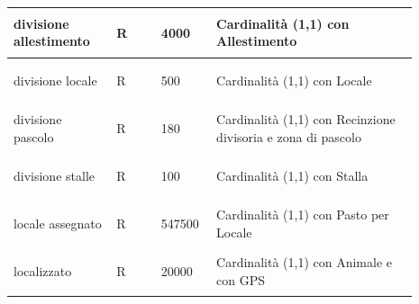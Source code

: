 \documentclass[12pt,a4paper]{article}
\begin{document}
\begin{center}
\begin{longtable}{|p{0.23\linewidth}|p{0.1\linewidth}|p{0.11\linewidth}|p{0.45\linewidth}|}
\hline
divisione allestimento 				& \begin{center}
\vspace{-25pt}R
\end{center}
					& \begin{center}
					\vspace{-25pt}4000\end{center}
					&  Cardinalità (1,1) con Allestimento \\ 

\hline
divisione locale 				& \begin{center}
\vspace{-25pt}R
\end{center}
					& \begin{center}
					\vspace{-25pt}500\end{center}
					&  Cardinalità (1,1) con Locale \\ 

\hline
divisione pascolo 				& \begin{center}
\vspace{-25pt}R
\end{center}
					& \begin{center}
					\vspace{-25pt}180\end{center}
					&  Cardinalità (1,1) con Recinzione divisoria e zona di pascolo \\ 

\hline
divisione stalle 				& \begin{center}
\vspace{-25pt}R
\end{center}
					& \begin{center}
					\vspace{-25pt}100\end{center}
					&  Cardinalità (1,1) con Stalla \\ 

\hline
locale assegnato 				& \begin{center}
\vspace{-25pt}R
\end{center}
					& \begin{center}
					\vspace{-25pt}547500\end{center}
					&  Cardinalità (1,1) con Pasto per Locale \\ 

\hline
localizzato 				& \begin{center}
\vspace{-25pt}R
\end{center}
					& \begin{center}
					\vspace{-25pt}20000\end{center}
					&  Cardinalità (1,1) con Animale e con GPS \\ 


\end{longtable}
\end{center}
\end{document}
